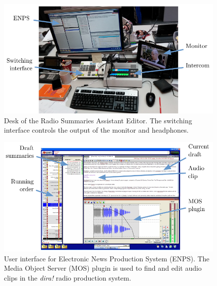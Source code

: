 \begin{figure}[p]
  \centering
  \includegraphics[width=\columnwidth]{figs/news-desk-labelled.pdf}
  \caption[Desk of the Radio Summaries Assistant Editor.]{Desk of the Radio Summaries Assistant Editor.  The switching
  interface controls the output of the monitor and headphones.}
  \label{fig:news-desktop}
\end{figure}

\begin{figure}[p]
  \centering
  \includegraphics[width=\columnwidth]{figs/news-enps-labelled.pdf}
  \caption[User interface for Electronic News Production System (ENPS).]{User interface for Electronic News Production
  System (ENPS).  The Media Object Server (MOS) plugin is used to find and edit audio clips in the \textit{dira!} radio
production system.}
  \label{fig:news-enps-edit}
\end{figure}

